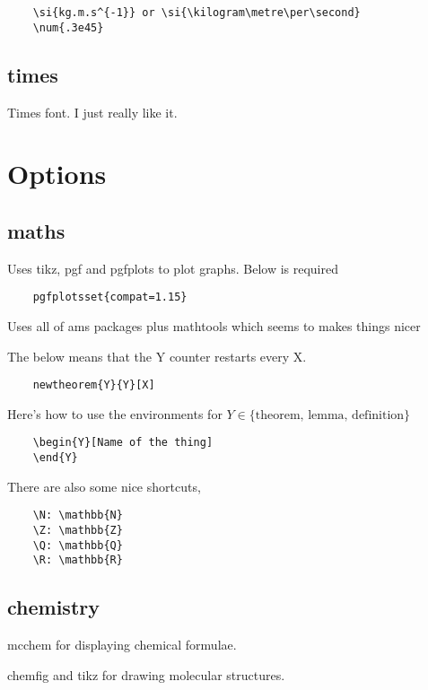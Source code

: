 \documentclass{article}
\begin{document}
\begin{verbatim}
	\si{kg.m.s^{-1}} or \si{\kilogram\metre\per\second}
	\num{.3e45} 
\end{verbatim}

\subsection{times}

Times font. I just really like it.

\section{Options}

\subsection{maths}

Uses tikz, pgf and pgfplots to plot graphs. Below is required
\begin{verbatim}
	pgfplotsset{compat=1.15} 
\end{verbatim}

Uses all of ams packages plus mathtools which seems to makes things nicer

The below means that the Y counter restarts every X.

\begin{verbatim}
	newtheorem{Y}{Y}[X]
\end{verbatim}

Here's how to use the environments for $Y \in \{ \text{theorem, lemma, definition} \}$

\begin{verbatim}
	\begin{Y}[Name of the thing]
	\end{Y}
\end{verbatim}

There are also some nice shortcuts,

\begin{verbatim}
	\N: \mathbb{N}
	\Z: \mathbb{Z}
	\Q: \mathbb{Q}
	\R: \mathbb{R}
\end{verbatim}

\subsection{chemistry}

mcchem for displaying chemical formulae.

chemfig and tikz for drawing molecular structures.
\end{document}
